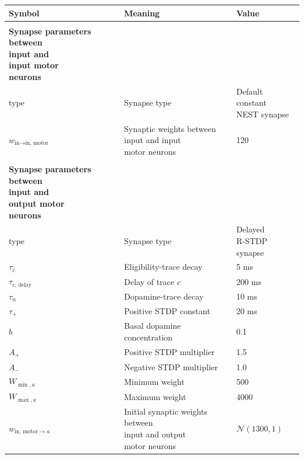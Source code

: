 \documentclass[a4paper,12pt,openright]{book}
\let\oldtable\table
\let\endoldtable\endtable
\renewenvironment{table}[1][htbp] %
{
    \oldtable[#1]
    \footnotesize                     %
}
{
    \endoldtable
}
\begin{document}
\begin{table}[htbp]
\begin{tabular}{lll}
\textbf{Symbol} & \textbf{Meaning} & \textbf{Value} \\ \hline
\\
\thead[l]{\bfseries Synapse parameters between \\
\bfseries input and \\
\bfseries input motor \\
\bfseries neurons} \\ \hline
type & Synapse type & \makecell[l]{Default \\ constant \\ NEST synapse} \\ \hline
\(w_{\text{in}\to\text{in, motor}}\) & \makecell[l]{Synaptic weights between \\ input and input \\ motor neurons} & 120 \\ \hline
\\
\thead[l]{\bfseries Synapse parameters between \\
\bfseries input and \\
\bfseries output motor \\
\bfseries neurons} \\ \hline
type & Synapse type & \makecell[l]{Delayed \\ R-STDP synapse} \\ \hline
\(\tau_{c}\) & Eligibility-trace decay & 5 ms \\ \hline
\(\tau_{c\text{, delay}}\) & Delay of trace $c$ & 200 ms \\ \hline
\(\tau_{n}\) & Dopamine-trace decay & 10 ms \\ \hline
\(\tau_{+}\) & Positive STDP constant & 20 ms \\ \hline
\(b\) & \makecell[l]{Basal dopamine \\ concentration} & 0.1  \\ \hline
\(A_{+}\) & Positive STDP multiplier & 1.5 \\ \hline
\(A_{-}\) & Negative STDP multiplier & 1.0 \\ \hline
\(W_{\min,a}\) & Minimum weight & 500 \\ \hline
\(W_{\max,a}\) & Maximum weight & 4000 \\ \hline
\(w_{\text{in, motor}\to a}\) & \makecell[l]{Initial synaptic weights between \\ input and output \\ motor neurons} & \(\mathcal{N}(1300, 1)\) \\ \hline
\end{tabular}
\caption{Synapse parameters between input and motor neurons}
\label{tab:params3}
\end{table}
\end{document}
